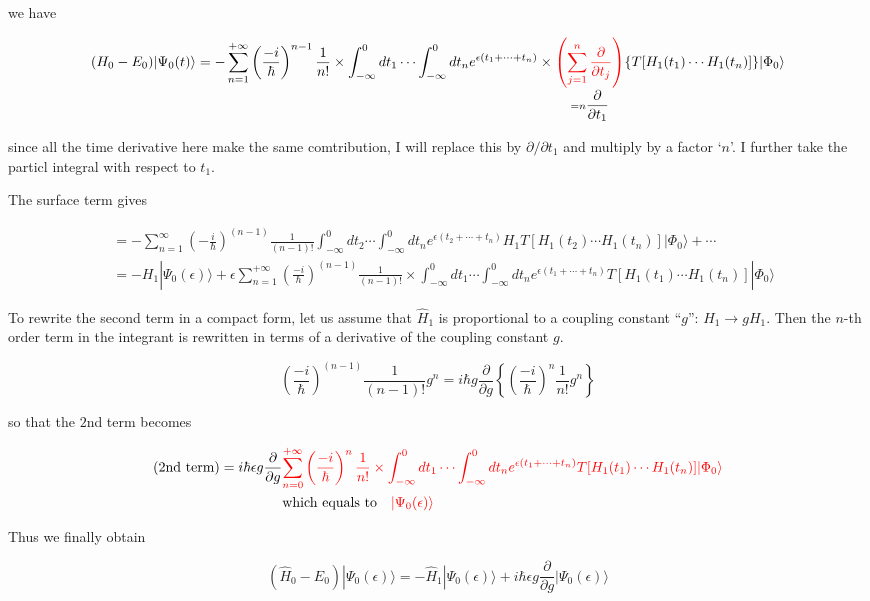 ﻿\documentclass[twoside]{book}
\numberwithin{equation}{section}
\begin{document}
we have

\[(H_0-E_0)|\Psi_0(t)\rangle = -\sum_{n=1}^{+\infty}\left(\frac{-i}{\hbar}\right)^{n-1}\frac{1}{n!}\times\int_{-\infty}^0dt_1\cdots\int_{-\infty}^0dt_n e^{\epsilon(t_1+\cdots+t_n)}\times\underset{=n\displaystyle\frac{\partial}{\partial t_1}}{{\color{red}{\left(\sum_{j=1}^n\frac{\partial}{\partial t_j}\right)}}}
\{T[H_1(t_1)\cdots H_1(t_n)]\}|\Phi_0\rangle \]

since all the time derivative here make the same comtribution, I will replace this by $\partial/\partial t_1$ and multiply by a factor `$n$'. I further take the particl integral with respect to $t_1$. 

The surface term gives

\[\begin{split}
&=-\sum_{n=1}^{\infty}\left(-\frac{i}{\hbar}\right)^{(n-1)}\frac{1}{(n-1)!}\int_{-\infty}^0 dt_2\cdots\int_{-\infty}^0 dt_n e^{\epsilon(t_2+\cdots+t_n)}H_1T[H_1(t_2)\cdots H_1(t_n)]|\Phi_0\rangle + \cdots\\
&=-H_1|\Psi_0(\epsilon)\rangle + \epsilon\sum_{n=1}^{+\infty}\left(\frac{-i}{\hbar}\right)^{(n-1)}\frac{1}{(n-1)!}\times \int_{-\infty}^0 dt_1\cdots\int_{-\infty}^0 dt_n e^{\epsilon(t_1+\cdots+t_n)}T[H_1(t_1)\cdots H_1(t_n)]|\Phi_0\rangle
\end{split}\]


To rewrite the second term in a compact form, let us assume that $\hat{H}_1$ is proportional to a coupling constant ``$g$'': $H_1\to gH_1$. Then the $n$-th order term in the integrant is rewritten in terms of a derivative of the coupling constant $g$. 

\[\left(\frac{-i}{\hbar}\right)^{(n-1)}\frac{1}{(n-1)!}g^n=i\hbar g\frac{\partial}{\partial g}\left\{\left(\frac{-i}{\hbar}\right)^n\frac{1}{n!}g^n\right\} \]

so that the $2$nd term becomes

\[\begin{split}
(2\text{nd term}) = i\hbar\epsilon g\frac{\partial}{\partial g} &{\color{red}{\sum_{n=0}^{+\infty}\left(\frac{-i}{\hbar}\right)^n\frac{1}{n!}\times \int_{-\infty}^0 dt_1\cdots \int_{-\infty}^0 dt_n e^{\epsilon(t_1+\cdots+t_n)}T[H_1(t_1)\cdots H_1(t_n)]|\Phi_0\rangle}}\\
&{\text{which equals to}} \quad {\color{red}{|\Psi_0(\epsilon)\rangle}}
\end{split}\]

Thus we finally obtain 

\[(\hat{H}_0-E_0)|\Psi_0(\epsilon)\rangle = -\hat{H}_1|\Psi_0(\epsilon)\rangle + i\hbar\epsilon g\frac{\partial}{\partial g}|\Psi_0(\epsilon)\rangle \]
\end{document}
